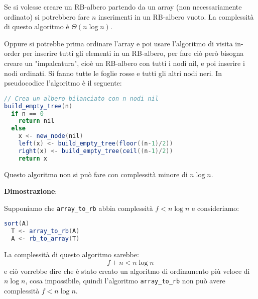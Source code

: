 \documentclass[a4paper]{article}
\begin{document}
\vspace{2em}
\noindent
Se si volesse creare un RB-albero partendo da un array (non necessariamente ordinato)
si potrebbero fare \( n \) inserimenti in un RB-albero vuoto. La complessità di questo
algoritmo è \( \Theta(n \log n) \).

\vspace{1em}
\noindent
Oppure si potrebbe prima ordinare l'array e poi
usare l'algoritmo di visita in-order per inserire tutti gli elementi in un RB-albero,
per fare ciò però bisogna creare un "impalcatura", cioè un RB-albero con tutti i nodi
nil, e poi inserire i nodi ordinati. Si fanno tutte le foglie rosse e tutti gli altri
nodi neri. In pseudocodice l'algoritmo è il seguente:
\begin{lstlisting}[language=Scala]
// Crea un albero bilanciato con n nodi nil
build_empty_tree(n)
  if n == 0
    return nil
  else
    x <- new_node(nil)
    left(x) <- build_empty_tree(floor((n-1)/2))
    right(x) <- build_empty_tree(ceil((n-1)/2))
    return x
\end{lstlisting}
\noindent
Questo algoritmo non si può fare con complessità minore di \( n \log n \).

\vspace{1em}
\noindent
\textbf{Dimostrazione}:

\noindent
Supponiamo che \texttt{array\_to\_rb} abbia complessità \( f < n \log n \) e consideriamo:
\begin{lstlisting}[language=Scala]
sort(A)
  T <- array_to_rb(A)
  A <- rb_to_array(T)
\end{lstlisting}
\noindent
La complessità di questo algoritmo sarebbe:
\[
f+n < n \log n
\] 
e ciò vorrebbe dire che è stato creato un algoritmo di ordinamento più veloce di \( n \log n \),
cosa impossibile, quindi l'algoritmo \texttt{array\_to\_rb} non può avere complessità
\( f < n \log n \).
\end{document}
